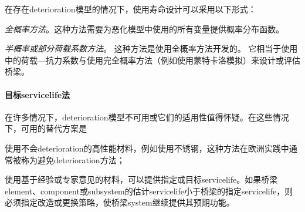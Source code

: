 在存在\gls*{deterioration}模型的情况下，使用寿命设计可以采用以下形式：

\emph{全概率方法}。这种方法需要为恶化模型中使用的所有变量提供概率分布函数。

\emph{半概率或部分荷载系数方法}。 这种方法是使用全概率方法开发的。 它相当于使用 \lrfd 中的荷载—抗力系数与使用完全概率方法（例如使用蒙特卡洛模拟）来设计或评估桥梁。

\paragraph*{目标\gls*{servicelife}法}
在许多情况下，\gls*{deterioration}模型不可用或它们的适用性值得怀疑。在这些情况下，可用的替代方案是
\begin{enumerate*}
  \item 使用不会\gls*{deterioration}的高性能材料，例如使用不锈钢，这种方法在欧洲实践中通常被称为避免\gls*{deterioration}方法；
  \item 使用基于经验或专家意见的材料，可以提供指定或目标\gls*{servicelife}。如果桥梁\gls*{element}、\gls*{component}或\gls*{subsystem}的估计\gls*{servicelife}小于桥梁的指定\gls*{servicelife}，则必须指定改造或更换策略，使桥梁\gls*{system}继续提供其预期功能。
\end{enumerate*}

